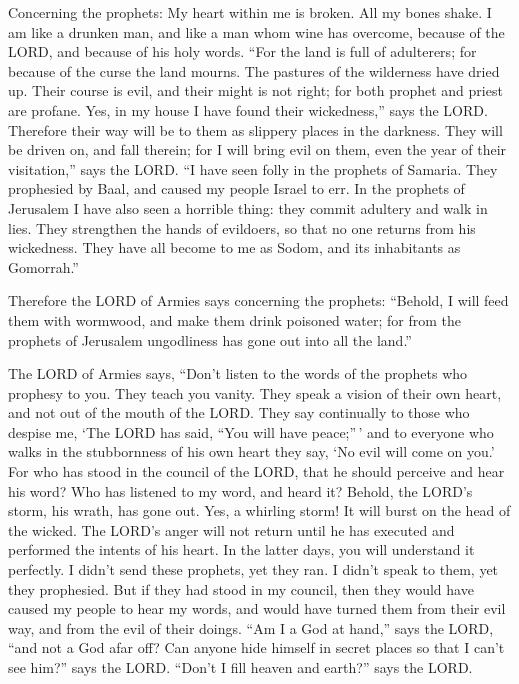  Concerning the prophets: My heart within me is broken.
All my bones shake. I am like a drunken man, and like a man whom wine
has overcome, because of the LORD, and because of his holy words.
 ``For the land is full of adulterers; for because of the
curse the land mourns. The pastures of the wilderness have dried up.
Their course is evil, and their might is not right;  for
both prophet and priest are profane. Yes, in my house I have found their
wickedness,'' says the LORD.  Therefore their way will be
to them as slippery places in the darkness. They will be driven on, and
fall therein; for I will bring evil on them, even the year of their
visitation,'' says the LORD.  ``I have seen folly in the
prophets of Samaria. They prophesied by Baal, and caused my people
Israel to err.  In the prophets of Jerusalem I have also
seen a horrible thing: they commit adultery and walk in lies. They
strengthen the hands of evildoers, so that no one returns from his
wickedness. They have all become to me as Sodom, and its inhabitants as
Gomorrah.''

 Therefore the LORD of Armies says concerning the
prophets: ``Behold, I will feed them with wormwood, and make them drink
poisoned water; for from the prophets of Jerusalem ungodliness has gone
out into all the land.''

 The LORD of Armies says, ``Don't listen to the words of
the prophets who prophesy to you. They teach you vanity. They speak a
vision of their own heart, and not out of the mouth of the LORD.
 They say continually to those who despise me, `The LORD
has said, ``You will have peace;''\,' and to everyone who walks in the
stubbornness of his own heart they say, `No evil will come on you.'
 For who has stood in the council of the LORD, that he
should perceive and hear his word? Who has listened to my word, and
heard it?  Behold, the LORD's storm, his wrath, has gone
out. Yes, a whirling storm! It will burst on the head of the wicked.
 The LORD's anger will not return until he has executed
and performed the intents of his heart. In the latter days, you will
understand it perfectly.  I didn't send these prophets,
yet they ran. I didn't speak to them, yet they prophesied.
 But if they had stood in my council, then they would
have caused my people to hear my words, and would have turned them from
their evil way, and from the evil of their doings.  ``Am
I a God at hand,'' says the LORD, ``and not a God afar off?
 Can anyone hide himself in secret places so that I can't
see him?'' says the LORD. ``Don't I fill heaven and earth?'' says the
LORD.

